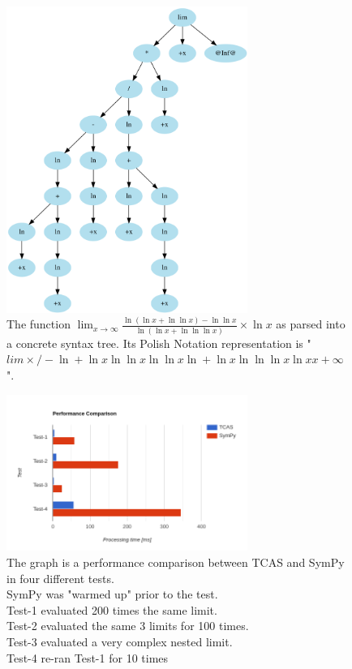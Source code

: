 \documentclass{article}
\theoremstyle{plain}
\theoremstyle{definition}
\theoremstyle{algorithm}
\begin{document}
\begin{appendices}
		\begin{figure}
			\centering
			\includegraphics[width=0.7\textwidth]{img/parsed.PNG}
			\caption{The function \(\lim_{x \to \infty}{\frac{\ln{(\ln{x} + \ln{\ln{x}}) - \ln{\ln{x}}}}{\ln{(\ln{x} + \ln{\ln{\ln{x}}})}}\times \ln{x}}\) as parsed into a concrete syntax tree. Its Polish Notation representation is "\(lim \times / - \ln + \ln x \ln \ln x \ln \ln x \ln + \ln x \ln \ln \ln x \ln x x +\infty\)".} \label{fig:parsed}
		\end{figure}
		
		\begin{figure}
			\centering
			\includegraphics[width=0.7\textwidth]{img/performance_graph.PNG}
			\caption{The graph is a performance comparison between TCAS and SymPy in four different tests.\\SymPy was "warmed up" prior to the test.\\Test-1 evaluated 200 times the same limit.\\Test-2 evaluated the same 3 limits for 100 times.\\Test-3 evaluated a very complex nested limit.\\Test-4 re-ran Test-1 for 10 times} \label{fig:performance_graph}  
		\end{figure}
		

\end{appendices}
\end{document}
